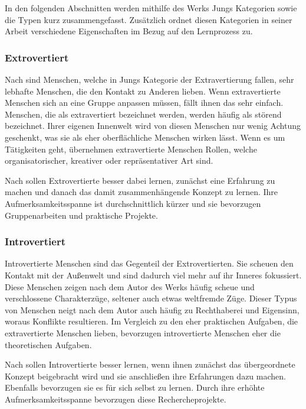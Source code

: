 In den folgenden Abschnitten werden mithilfe des Werks  Jungs Kategorien sowie die Typen kurz zusammengefasst. Zusätzlich ordnet \citeauthor{mccaulley_myers-briggs_1974} diesen Kategorien in seiner Arbeit  verschiedene Eigenschaften im Bezug auf den Lernprozess zu. \cite{mccaulley_myers-briggs_1974}
\subsubsection{Extrovertiert}
Nach \citeauthor{jung_2014} sind Menschen, welche in Jungs Kategorie der Extravertierung
fallen, sehr lebhafte Menschen, die den Kontakt zu Anderen lieben. Wenn extravertierte Menschen sich an eine Gruppe anpassen müssen, fällt ihnen das sehr einfach. Menschen, die als extravertiert bezeichnet werden, werden häufig als störend bezeichnet. Ihrer eigenen Innenwelt wird von diesen Menschen nur wenig Achtung geschenkt, was sie als eher oberflächliche Menschen wirken lässt. Wenn es um Tätigkeiten geht, übernehmen extravertierte Menschen Rollen, welche organisatorischer, kreativer oder repräsentativer Art sind. 

\noindent
\cite{jung_2014}

Nach \citeauthor{mccaulley_myers-briggs_1974} sollen Extrovertierte besser dabei lernen, zunächst eine Erfahrung zu machen und danach das damit zusammenhängende Konzept zu lernen. Ihre Aufmerksamkeitsspanne ist durchschnittlich kürzer und sie bevorzugen Gruppenarbeiten und praktische Projekte. \cite{mccaulley_myers-briggs_1974}

\subsubsection{Introvertiert}

Introvertierte Menschen sind das Gegenteil der Extrovertierten. Sie scheuen den Kontakt mit der Außenwelt und sind dadurch viel mehr auf ihr Inneres fokussiert. Diese Menschen zeigen nach dem Autor \citeauthor{jung_2014} des Werks  häufig scheue und verschlossene Charakterzüge, seltener auch etwas weltfremde Züge. Dieser Typus von Menschen neigt nach dem Autor auch häufig zu Rechthaberei und Eigensinn, woraus Konflikte resultieren. Im Vergleich zu den eher praktischen Aufgaben, die extravertierte Menschen lieben, bevorzugen introvertierte Menschen eher die theoretischen Aufgaben.

\noindent
\cite{jung_2014}

Nach \citeauthor{mccaulley_myers-briggs_1974} sollen Introvertierte besser lernen, wenn ihnen zunächst das übergeordnete Konzept beigebracht wird und sie anschließen ihre Erfahrungen dazu machen. Ebenfalls bevorzugen sie es für sich selbst zu lernen. Durch ihre erhöhte Aufmerksamkeitsspanne bevorzugen diese Rechercheprojekte. \cite{mccaulley_myers-briggs_1974}


